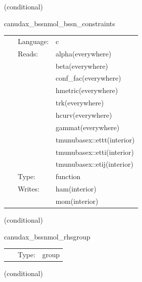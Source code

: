 \vspace{5mm}

   (conditional) 

\hspace{5mm} canudax\_bssnmol\_bssn\_constraints 

\hspace{5mm}{\it compute constraints } 


\hspace{5mm}

 \begin{tabular*}{160mm}{cll} 
~ & Language:  & c \\ 
~ & Reads:  & alpha(everywhere) \\ 
~& ~ &beta(everywhere)\\ 
~& ~ &conf\_fac(everywhere)\\ 
~& ~ &hmetric(everywhere)\\ 
~& ~ &trk(everywhere)\\ 
~& ~ &hcurv(everywhere)\\ 
~& ~ &gammat(everywhere)\\ 
~& ~ &tmunubasex::ettt(interior)\\ 
~& ~ &tmunubasex::etti(interior)\\ 
~& ~ &tmunubasex::etij(interior)\\ 
~ & Type:  & function \\ 
~ & Writes:  & ham(interior) \\ 
~& ~ &mom(interior)\\ 
\end{tabular*} 


\vspace{5mm}

   (conditional) 

\hspace{5mm} canudax\_bssnmol\_rhsgroup 

\hspace{5mm}{\it canudax\_bssnmol: calculate bssn rhs } 


\hspace{5mm}

 \begin{tabular*}{160mm}{cll} 
~ & Type:  & group \\ 
\end{tabular*} 


\vspace{5mm}

   (conditional) 

